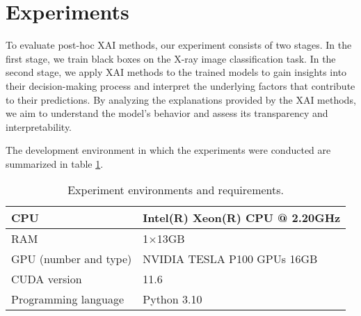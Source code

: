 \section{Experiments}
To evaluate post-hoc XAI methods, our experiment consists of two stages. In the first stage, we train black boxes on the X-ray image classification task. In the second stage, we apply XAI methods to the trained models to gain insights into their decision-making process and interpret the underlying factors that contribute to their predictions. By analyzing the explanations provided by the XAI methods, we aim to understand the model's behavior and assess its transparency and interpretability.



The development environment in which the experiments were conducted are summarized in table \ref{table:env}.




\begin{table}[h!]
\caption{Experiment environments and requirements.}\label{table:env}
\centering
\begin{tabular}{ll}
\hline
CPU   & Intel(R) Xeon(R) CPU @ 2.20GHz \\
\hline
RAM                         &1$\times $13GB \\
\hline
GPU (number and type)                         & NVIDIA TESLA P100 GPUs 16GB\\
\hline
CUDA version                  & 11.6\\                          \hline
Programming language                 & Python 3.10\\ 
\hline
\end{tabular}
\end{table}


